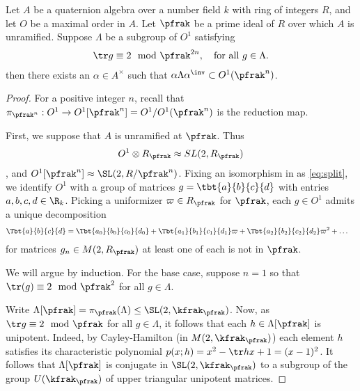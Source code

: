 \begin{lemma}\label{lemma:MangosteenPicosdeEuropa}
	Let $A$ be a quaternion algebra over a number field $k$ with ring of integers $R$, and let $O$ be a maximal order in $A$.
	Let $\pfrak$ be a prime ideal of $R$ over which $A$ is unramified.
	Suppose $\Lambda$ be a subgroup of $O^1$ satisfying
	\begin{align}\label{eq:trace}
		\tr g \equiv 2 \mod \pfrak^{2n}, \quad \text{for all $g \in \Lambda$}.
	\end{align}
	then there exists an $\alpha \in A^\times$ such that $\alpha \Lambda \alpha^\inv \subset O^1(\pfrak^n)$.
\end{lemma}
\begin{proof}
	For a positive integer $n$, recall that $\pi_{\pfrak^n}: O^1 \to O^1[\pfrak^n]=O^1/O^1(\pfrak^n)$ is the reduction map.

	First, we suppose that $A$ is unramified at $\pfrak$.
	Thus
	\begin{align}\label{eq:split}
		O^1 \otimes R_\pfrak \approx SL(2,R_\pfrak)
	\end{align}, and $O^1[\pfrak^n] \approx \SL(2,R/\pfrak^n)$. Fixing an isomorphism in as \ref{eq:split}, we identify $O^1$ with a group of matrices $g = \tbt{a}{b}{c}{d}$ with entries $a,b,c,d \in \R_k$. Picking a uniformizer $\varpi \in R_\pfrak$ for $\pfrak$, each $g\in O^1$ admits a unique decomposition
	\begin{align}\label{eq:decomposition}
		\Tbt{a}{b}{c}{d} & =  \Tbt{a_0}{b_0}{c_0}{d_0} +\Tbt{a_1}{b_1}{c_1}{d_1} \varpi + \Tbt{a_2}{b_2}{c_2}{d_2} \varpi^2 + \dots
	\end{align}
	for matrices $g_n \in M(2,R_\pfrak)$ at least one of each is not in $\pfrak$.

	We will argue by induction. For the base case, suppose $n=1$ so that $\tr(g) \equiv 2 \mod \pfrak^2$ for all $g \in \Lambda$.


	Write $\Lambda[\pfrak] = \pi_{\pfrak}(\Lambda)\leq \SL(2,\kfrak_\pfrak)$. Now, as $\tr g \equiv 2 \mod \pfrak$ for all $g \in \Lambda$, it follows that each $h \in \Lambda[\pfrak]$ is unipotent.
	Indeed, by Cayley-Hamilton (in $M(2,\kfrak_\pfrak)$) each element $h$ satisfies its characteristic polynomial $p(x;h)=x^2 - \tr h x + 1= (x-1)^2$.
	It follows that $\Lambda[\pfrak]$ is conjugate in $\SL(2,\kfrak_\pfrak)$ to a subgroup of the group $U(\kfrak_\pfrak)$ of upper triangular unipotent matrices.


\end{proof}
